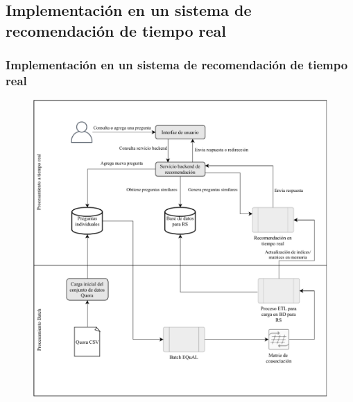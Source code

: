 \subsection{Implementación en un sistema de recomendación de tiempo real}
\begin{frame}
	\frametitle{Implementación en un sistema de recomendación de tiempo real}
	\begin{figure}
		\centering
		\includegraphics[width=0.55\linewidth]{../8_problema_investigacion/imagenes/implementacion_rs}
		\label{fig:implementacionrs}
	\end{figure}
\end{frame}